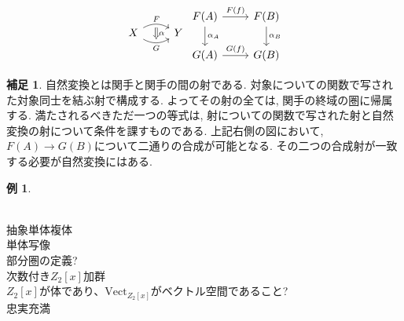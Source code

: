 \documentclass[a4paper]{jsarticle}
\theoremstyle{definition}
\newtheorem{exam}[dfn]{例}
\newtheorem{hsk}[dfn]{補足}
\newcommand{\Vect}{{\mathrm{Vect}}}
\begin{document}
\begin{equation}
\begin{tikzcd}
X
\arrow[r, bend left, "F"]
\arrow[r, bend right, swap, "G"]
\arrow[r, phantom, bend left, shift right=0.2ex, ""{name=U}]
\arrow[r, phantom, bend right, shift left=0.2ex, swap, ""{name=D}]
&Y
\arrow[Rightarrow, from=U, to=D, "\alpha"]
\end{tikzcd}
     \begin{tikzcd}
        F(A)\arrow{r}{F(f)} \arrow{d}{\alpha_A} & F(B)\arrow{d}{\alpha_B}\\
        G(A)\arrow{r}{G(f)} & G(B)
    \end{tikzcd}
\end{equation}
\begin{hsk}
    自然変換とは関手と関手の間の射である. 対象についての関数で写された対象同士を結ぶ射で構成する. よってその射の全ては, 関手の終域の圏に帰属する. 満たされるべきただ一つの等式は, 射についての関数で写された射と自然変換の射について条件を課すものである. 上記右側の図において, $F(A)\rightarrow G(B)$について二通りの合成が可能となる. その二つの合成射が一致する必要が自然変換にはある.
\end{hsk}
\begin{exam}
    
\end{exam}
\noindent\\

抽象単体複体\\
単体写像\\
部分圏の定義?\\
次数付き$Z_2[x]加群$\\
$Z_2[x]$が体であり、$\Vect_{Z_2[x]}$がベクトル空間であること?\\
忠実充満\\
\end{document}
